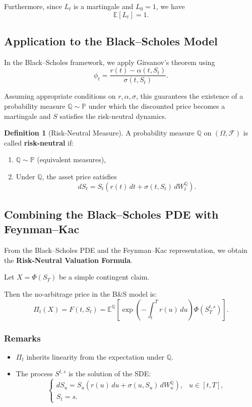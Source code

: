 \documentclass[12pt,a4paper]{article}
\theoremstyle{definition}
\newtheorem{definition}{Definition}[section]
\newcommand{\Q}{\mathbb{Q}}
\newcommand{\E}{\mathbb{E}}
\newcommand{\Prob}{\mathbb{P}}
\begin{document}
Furthermore, since $L_t$ is a martingale and $L_0 = 1$, we have
\[
\E[L_t] = 1.
\]

\subsection{Application to the Black–Scholes Model}

In the Black–Scholes framework, we apply Girsanov's theorem using
\[
\phi_t = \frac{r(t) - \alpha(t, S_t)}{\sigma(t, S_t)}.
\]

Assuming appropriate conditions on $r, \alpha, \sigma$, this guarantees the existence of a probability measure $\Q \sim \Prob$ under which the discounted price becomes a martingale and $S$ satisfies the risk-neutral dynamics.

\begin{definition}[Risk-Neutral Measure]
A probability measure $\Q$ on $(\Omega, \mathcal{F})$ is called \textbf{risk-neutral} if:
\begin{enumerate}
\item $\Q \sim \Prob$ (equivalent measures),
\item Under $\Q$, the asset price satisfies
\[
dS_t = S_t(r(t) \, dt + \sigma(t, S_t) \, dW_t^\Q).
\]
\end{enumerate}
\end{definition}

\subsection{Combining the Black–Scholes PDE with Feynman–Kac}

From the Black–Scholes PDE and the Feynman–Kac representation, we obtain the \textbf{Risk-Neutral Valuation Formula}.

Let $X = \Phi(S_T)$ be a simple contingent claim.

Then the no-arbitrage price in the B\&S model is:
\[
\Pi_t(X) = F(t, S_t) = \E^\Q\left[\exp\left(-\int_t^T r(u) \, du\right)\Phi(S_T^{t,s})\right].
\]

\subsubsection{Remarks}

\begin{itemize}
\item $\Pi_t$ inherits linearity from the expectation under $\Q$.
\item The process $S^{t,s}$ is the solution of the SDE:
\[
\begin{cases}
dS_u = S_u(r(u) \, du + \sigma(u, S_u) \, dW_u^\Q), & u \in [t, T], \\
S_t = s.
\end{cases}
\]
\end{itemize}
\end{document}
